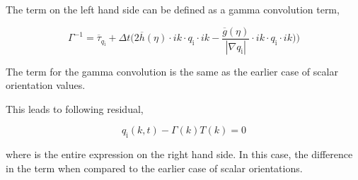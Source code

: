 \documentclass[a4paper,11pt,dvipsnames]{article}
\begin{document}
The term on the left hand side can be defined as a gamma convolution term,

\begin{equation}
	\Gamma^{-1} = \overline{\tau}_{q_{\text{i}}} + \Delta t \biggl ( 2 \overline{h} (\eta) \cdot ik \cdot q_{\text{i}} \cdot ik - \frac{\overline{g}(\eta)}{| \nabla q_{\text{i}}| } \cdot ik \cdot q_{\text{i}} \cdot ik \biggr ) \biggr ) \label{eq:42}
\end{equation}

The term for the gamma convolution is the same as the earlier case of scalar orientation values. 

This leads to following residual, 

\begin{equation}
	q_{\text{i}}(k,t) - \Gamma(k) T(k) = 0 \label{eq:43}
\end{equation}

where  is the entire expression on the right hand side. In this case, the difference in the  term when compared to the earlier case of scalar orientations.  


\end{document}
